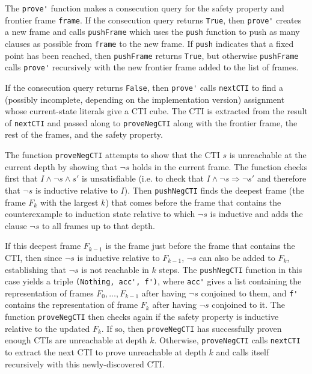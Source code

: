 \documentclass[12pt,a4paper,twoside,openright]{report}
\begin{document}
The \verb,prove', function makes a consecution query for the safety property and frontier
frame \verb,frame,. If the consecution query returns \verb,True,, then \verb,prove',
creates a new frame and calls \verb,pushFrame, which uses the \verb,push, function to
push as many clauses as possible from \verb,frame, to the new frame. If \verb,push,
indicates that a fixed point has been reached, then \verb,pushFrame, returns \verb,True,,
but otherwise \verb,pushFrame, calls \verb,prove', recursively with the new frontier
frame added to the list of frames.

If the consecution query returns \verb,False,, then \verb,prove', calls \verb,nextCTI,
to find a (possibly incomplete, depending on the implementation version)
assignment whose current-state literals give a CTI cube.
The CTI is extracted from the result of \verb,nextCTI, and passed along to \verb,proveNegCTI,
along with the frontier frame, the rest of the frames, and the safety property.

The function \verb,proveNegCTI, attempts to show that the CTI
$s$ is unreachable at the current depth by showing that $\neg s$ holds in the current frame.
The function checks first that $I \wedge \neg s \wedge s'$ is unsatisfiable
(i.e. to check that $I \wedge \neg s \Rightarrow \neg s'$ and therefore that $\neg s$ is
inductive relative to $I$). Then \verb,pushNegCTI, finds the deepest frame (the frame
$F_k$ with the largest $k$) that comes before the frame that contains the counterexample to
induction state relative to which $\neg s$ is inductive and adds the clause
$\neg s$ to all frames up to that depth.

If this deepest frame $F_{k - 1}$ is the frame just before the frame that contains the
CTI, then since $\neg s$ is inductive relative to $F_{k - 1}$, $\neg s$ can also be added
to $F_k$, establishing that $\neg s$ is not reachable in $k$ steps. The \verb,pushNegCTI,
function in this case yields a triple \verb:(Nothing, acc', f'):, where \verb,acc', gives
a list containing the representation of frames $F_0, \ldots, F_{k - 1}$ after having $\neg s$
conjoined to them, and \verb,f', contains the representation of frame $F_k$ after having
$\neg s$ conjoined to it. The function \verb,proveNegCTI, then checks again if the safety
property is inductive relative to the updated $F_k$. If so, then \verb,proveNegCTI, has
successfully proven enough CTIs are unreachable at depth $k$. Otherwise, \verb,proveNegCTI,
calls \verb,nextCTI, to extract the next CTI to prove unreachable at depth $k$ and calls
itself recursively with this newly-discovered CTI.
\end{document}
